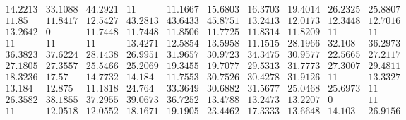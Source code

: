 \documentclass[12pt,oneside,a4paper]{article}
\begin{document}
\begin{equation}
  \tag{Mean Tabu Duration for each city (alpha = 1 and 100 cities)}
  \begin{smallmatrix} 14.2213 & 33.1088 & 44.2921 & 11 & 11.1667 & 15.6803 & 16.3703 & 19.4014 & 26.2325 & 25.8807 \\
    11.85 & 11.8417 & 12.5427 & 43.2813 & 43.6433 & 45.8751 & 13.2413 & 12.0173 & 12.3448 & 12.7016 \\
    13.2642 & 0 & 11.7448 & 11.7448 & 11.8506 & 11.7725 & 11.8314 & 11.8209 & 11 & 11 \\
    11 & 11 & 11 & 13.4271 & 12.5854 & 13.5958 & 11.1515 & 28.1966 & 32.108 & 36.2973 \\
    36.3823 & 37.6224 & 28.1438 & 26.9951 & 31.9657 & 30.9723 & 34.3475 & 30.9577 & 22.5665 & 27.2117 \\
    27.1805 & 27.3557&  25.5466 & 25.2069 & 19.3455 & 19.7077 & 29.5313 & 31.7773 & 27.3007 & 29.4811 \\
    18.3236 & 17.57 & 14.7732 & 14.184 & 11.7553 & 30.7526&  30.4278 & 31.9126 & 11 & 13.3327 \\
    13.184 & 12.875 & 11.1818 & 24.764 & 33.3649 & 30.6882 & 31.5677 & 25.0468 & 25.6973 & 11 \\
    26.3582 & 38.1855 & 37.2955 & 39.0673 & 36.7252 & 13.4788 & 13.2473 & 13.2207 & 0 & 11 \\ 
    11 & 12.0518 & 12.0552 & 18.1671 & 19.1905 & 23.4462 & 17.3333 & 13.6648 & 14.103 & 26.9156 \\
  \end{smallmatrix}
\end{equation}
\end{document}
